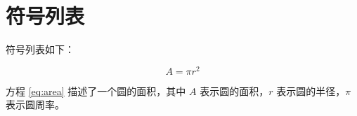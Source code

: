 \documentclass{article}
\begin{document}
\section{符号列表}

符号列表如下：

\begin{equation}
    \label{eq:area}
    A = \pi r^2
\end{equation}

方程 \ref{eq:area} 描述了一个圆的面积，其中 $A$ 表示圆的面积，$r$ 表示圆的半径，$\pi$ 表示圆周率。

\printnomenclature
\end{document}
